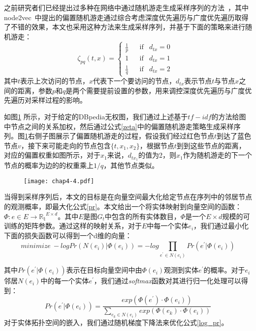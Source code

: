 \noindent 之前研究者们已经提出过多种在网络中通过随机游走生成采样序列的方法~\cite{kdd/Perozzi14, kdd/GroverL16}，其中node2vec~\cite{kdd/GroverL16}中提出的偏置随机游走通过综合考虑深度优先遍历与广度优先遍历取得了不错的效果，本文也采用这种方法来生成采样序列，并基于下面的策略来进行随机游走：
\begin{equation}
    \label{zeta}
    \zeta_{pq}(t,x) = \left\{\begin{matrix}
        \frac{1}{p} && \text{if} & d_{tx} = 0 & \\
        1           && \text{if} & d_{tx} = 1 & \\
        \frac{1}{q} && \text{if} & d_{tx} = 2 &
        \end{matrix}\right.
\end{equation}
\noindent 其中$t$表示上次访问的节点，$x$代表下一个要访问的节点，$d_{tx}$表示节点$t$与节点$x$之间的距离，参数$p$和$q$是两个需要提前设置的参数，用来调控深度优先遍历与广度优先遍历对采样过程的影响。

如图\ref{chap4-4} 所示，对于给定的DBpedia无权图，我们通过上述基于$tf-idf$的方法给图中节点之间的关系加权，然后通过公式\ref{zeta}中的偏置随机游走策略生成采样序列。图\ref{chap4-4}右侧子图展示了偏置随机游走的过程，假设我们经过红色节点$t$到达了蓝色节点$v$，接下来可能走向的节点包含$\{t, x_1, x_2\}$，根据节点$t$到到这些节点的距离，对应的偏置权重如图所示，对于$x_1$来说，$d_{tx_1}$的值为2，则$x_1$作为随机游走的下一个节点的概率为边的的权重乘上$1/q$，其他节点类似。

\begin{figure}[!ht]
    \centerline{\texttt{[image: chap4-4.pdf]}}
    \label{chap4-4}
\end{figure}

当得到采样序列后，本文的目标是在向量空间最大化给定节点在序列中的邻居节点的观测概率，即最大化公式\ref{pr}。本文给出一个将实体映射到向量空间的函数：$\Phi: e \in E \rightarrow \mathbb{R_t}^{E \times d}$。其中$E$是图$G_t$中包含的所有实体数目，$\Phi$是一个$E \times d$规模的可训练的矩阵参数。通过这样的映射关系，对于$E$中每一个实体$e_i$，我们通过最小化下面的损失函数可以得到一个d维的向量：
\begin{equation}
    \label{log_pr}
    minimize\ -log Pr(N(e_i)|\Phi(e_i)) = -log\prod_{e^{'} \in N(e_i)}^{ }Pr(e^{'}|\Phi(e_i))
\end{equation}

\noindent 其中$Pr(e^{'}|\Phi(e_i))$表示在目标向量空间中由$\Phi(e_i)$观测到实体$e^{'}$的概率。对于$e_i$邻居$N(e_i)$中的每一个实体$e^{'}$，我们通过\emph{softmax}函数对其进行归一化处理可以得到：
\begin{equation}
    Pr(e^{'}|\Phi(e_i)) = \frac{exp(\Phi(e^{'})\cdot \Phi(e_i))}{\sum_{e_k \in N(e_i)}^{ }exp(\Phi(e_k)\cdot \Phi(e_i))}
\end{equation}
\noindent 对于实体拓扑空间的嵌入，我们通过随机梯度下降法来优化公式\ref{log_pr}。


